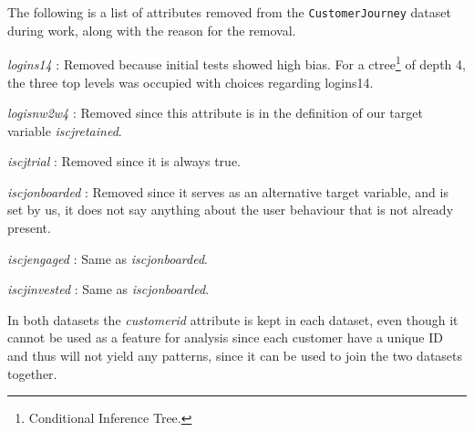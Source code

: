 \noindent The following is a list of attributes removed from the \texttt{CustomerJourney}
dataset during work, along with the reason for the removal.

\begin{itemize*}
	\item \textit{logins14} : Removed because initial tests showed high bias. For
	      a ctree\footnote{Conditional Inference Tree.} of depth 4, the three top
	      levels was occupied with choices regarding logins14.

	\item \textit{logisnw2w4} : Removed since this attribute is in the definition
	      of our target variable \textit{iscjretained}.

	\item \textit{iscjtrial} : Removed since it is always true.

	\item \textit{iscjonboarded} : Removed since it serves as an alternative target
	      variable, and is set by us, it does not say anything about the user
	      behaviour that is not already present.

	\item \textit{iscjengaged} : Same as \textit{iscjonboarded}.
	\item \textit{iscjinvested} : Same as \textit{iscjonboarded}.
\end{itemize*}

In both datasets the \textit{customerid} attribute is kept in each dataset, even
though it cannot be used as a feature for analysis since each customer have a
unique ID and thus will not yield any patterns, since it can be used to join the
two datasets together.
